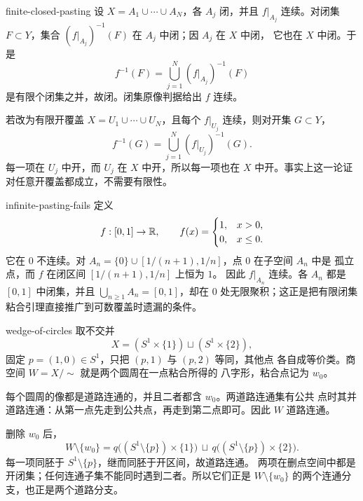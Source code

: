 \begin{solution}{finite-closed-pasting}
设 \(X=A_1\cup\cdots\cup A_N\)，各 \(A_j\) 闭，并且
\(f|_{A_j}\) 连续。对闭集 \(F\subset Y\)，集合
\((f|_{A_j})^{-1}(F)\) 在 \(A_j\) 中闭；因 \(A_j\) 在 \(X\) 中闭，
它也在 \(X\) 中闭。于是
\[
 f^{-1}(F)=\bigcup_{j=1}^N(f|_{A_j})^{-1}(F)
\]
是有限个闭集之并，故闭。闭集原像判据给出 \(f\) 连续。

若改为有限开覆盖 \(X=U_1\cup\cdots\cup U_N\)，且每个
\(f|_{U_j}\) 连续，则对开集 \(G\subset Y\)，
\[
 f^{-1}(G)=\bigcup_{j=1}^N(f|_{U_j})^{-1}(G).
\]
每一项在 \(U_j\) 中开，而 \(U_j\) 在 \(X\) 中开，所以每一项也在
\(X\) 中开。事实上这一论证对任意开覆盖都成立，不需要有限性。
\end{solution}

\begin{solution}{infinite-pasting-fails}
定义
\[
 f:[0,1]\to\mathbb{R},\qquad
 f(x)=
 \begin{cases}
  1,&x>0,\\
  0,&x\le0.
 \end{cases}
\]
它在 \(0\) 不连续。对
\(A_n=\{0\}\cup[1/(n+1),1/n]\)，点 \(0\) 在子空间 \(A_n\) 中是
孤立点，而 \(f\) 在闭区间 \([1/(n+1),1/n]\) 上恒为 \(1\)。
因此 \(f|_{A_n}\) 连续。各 \(A_n\) 都是 \([0,1]\) 中闭集，并且
\(\bigcup_{n\ge1}A_n=[0,1]\)，却在 \(0\) 处无限聚积；这正是把有限闭集
粘合引理直接推广到可数覆盖时遗漏的条件。
\end{solution}

\begin{solution}{wedge-of-circles}
取不交并
\[
 X=(S^1\times\{1\})\sqcup(S^1\times\{2\}),
\]
固定 \(p=(1,0)\in S^1\)，只把 \((p,1)\) 与 \((p,2)\) 等同，其他点
各自成等价类。商空间 \(W=X/{\sim}\) 就是两个圆周在一点粘合所得的
八字形，粘合点记为 \(w_0\)。

每个圆周的像都是道路连通的，并且二者都含 \(w_0\)。两道路连通集有公共
点时其并道路连通：从第一点先走到公共点，再走到第二点即可。因此 \(W\)
道路连通。

删除 \(w_0\) 后，
\[
 W\setminus\{w_0\}
   =q\bigl((S^1\setminus\{p\})\times\{1\}\bigr)
    \,\sqcup\,
    q\bigl((S^1\setminus\{p\})\times\{2\}\bigr).
\]
每一项同胚于 \(S^1\setminus\{p\}\)，继而同胚于开区间，故道路连通。
两项在删点空间中都是开闭集；任何连通子集不能同时遇到二者。所以它们正是
\(W\setminus\{w_0\}\) 的两个连通分支，也正是两个道路分支。
\end{solution}

